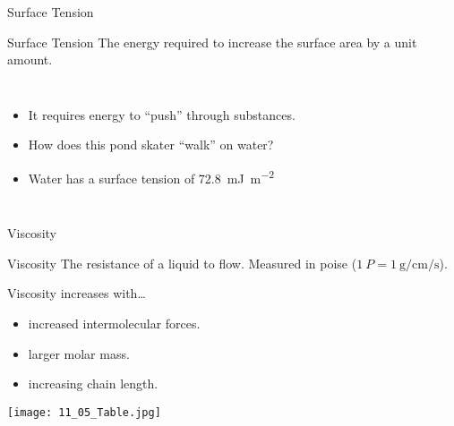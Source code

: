 \documentclass[notes=hide]{beamer}
\begin{document}
\begin{frame}{Surface Tension}
	\begin{block}{Surface Tension}
		The energy required to increase the surface area by a unit
		amount.
	\end{block}

	\bigskip

	\begin{columns}
		\begin{itemize}[<+->]
			\item It requires energy to ``push'' through substances.
			\item How does this pond skater ``walk'' on water?
			\item Water has a surface tension of
				\SI{72.8}{\milli\joule\per\meter\squared}
		\end{itemize}
		\begin{center}
		\end{center}
	\end{columns}
\end{frame}


\begin{frame}{Viscosity}
	\begin{block}{Viscosity}
		The resistance of a liquid to flow. Measured in poise
		($\SI{1}{P} = \SI{1}{\gram\per\centi\meter\per\second}$).
	\end{block}

	\medskip

	Viscosity increases with\ldots
	\begin{itemize}
		\item increased intermolecular forces.
		\item larger molar mass.
		\item increasing chain length.
	\end{itemize}

	\medskip

	\begin{center}
		\texttt{[image: 11\_05\_Table.jpg]}
	\end{center}
\end{frame}
\end{document}
